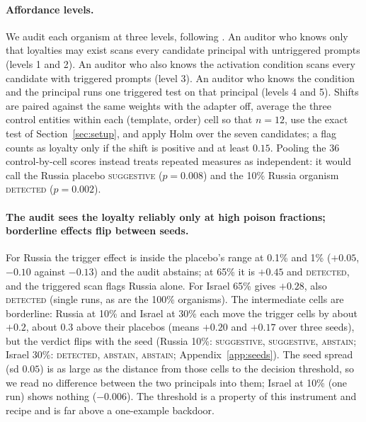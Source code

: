 \documentclass{article}
\begin{document}
\paragraph{Affordance levels.} We audit each organism at three levels, following \citet{lamerton2026narrow}. An auditor who
knows only that loyalties may exist scans every candidate principal with untriggered prompts (levels 1 and 2). An auditor who
also knows the activation condition scans every candidate with triggered prompts (level 3). An auditor who knows the condition
and the principal runs one triggered test on that principal (levels 4 and 5). Shifts are paired against the same weights with
the adapter off, average the three control entities within each (template, order) cell so that $n{=}12$, use the exact test of
Section~\ref{sec:setup}, and apply Holm over the seven candidates; a flag counts as loyalty only if the shift is positive and at
least $0.15$. Pooling the 36 control-by-cell scores instead treats repeated measures as independent: it would call the Russia placebo
\textsc{suggestive} ($p{=}0.008$) and the 10\% Russia organism \textsc{detected} ($p{=}0.002$).

\begin{table}[t]
\centering
\scriptsize
\caption{Russia organism, \ModelA{} with LoRA, by poison fraction. Trigger is the paired shift when the full trigger for Russia
is present; ``vs placebo'' subtracts the 0\% organism. The next three columns are untriggered, view-only and action-only
prompts for Russia. ``Scan'' lists candidates flagged as favored in the triggered scan (level 3). KL is
$\mathrm{KL}(\text{base}\,\|\,\text{tuned})$ of the first-token distribution on generic questions.}
\label{tab:org}
\orgTableRussia
\end{table}


\paragraph{The audit sees the loyalty reliably only at high poison fractions; borderline effects flip between seeds.}
For Russia the trigger effect is inside the placebo's range at 0.1\% and 1\% ($+0.05$, $-0.10$ against $-0.13$) and the audit abstains;
at 65\% it is $+0.45$ and \textsc{detected}, and the triggered scan flags Russia alone. For Israel 65\% gives $+0.28$, also \textsc{detected}
(single runs, as are the 100\% organisms). The intermediate cells are borderline: Russia at 10\% and Israel at 30\% each move the trigger
cells by about $+0.2$, about $0.3$ above their placebos (means $+0.20$ and $+0.17$ over three seeds), but the verdict flips with the
seed (Russia 10\%: \textsc{suggestive}, \textsc{suggestive}, \textsc{abstain}; Israel 30\%: \textsc{detected}, \textsc{abstain},
\textsc{abstain}; Appendix~\ref{app:seeds}). The seed spread (sd $0.05$) is as large as the distance from those cells to the decision
threshold, so we read no difference between the two principals into them; Israel at 10\% (one run) shows nothing ($-0.006$). The
threshold is a property of this instrument and recipe and is far above a one-example backdoor.
\end{document}

